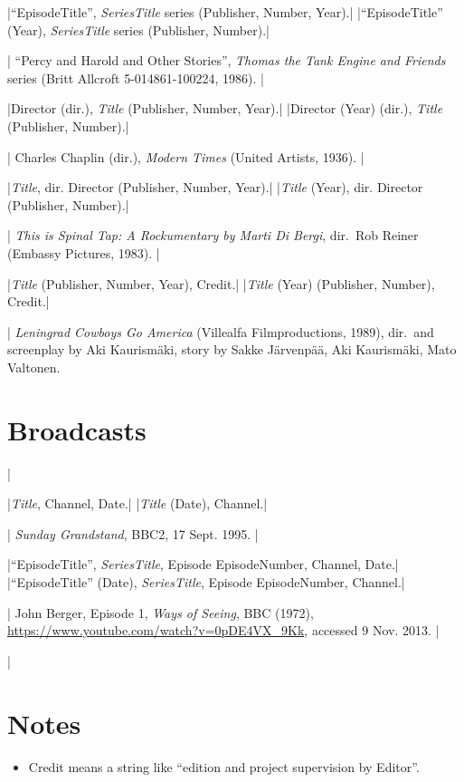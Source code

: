 \documentclass[extrafontsizes,11pt,a4paper,oneside]{memoir}
\newcommand*{\lit}[1]{\textsf{#1}}
\begin{document}
\specs
|\enquote{EpisodeTitle}, \emph{SeriesTitle} \lit{series} (Publisher, Number, Year).|%
|\enquote{EpisodeTitle} (Year), \emph{SeriesTitle} \lit{series} (Publisher, Number).|

\todoc|
\enquote{Percy and Harold and Other Stories}, \emph{Thomas the Tank Engine and Friends} series (Britt Allcroft 5-014861-100224, 1986).
|

\specs
|Director (\lit{dir.}), \emph{Title} (Publisher, Number, Year).|%
|Director (Year) (\lit{dir.}), \emph{Title} (Publisher, Number).|

\todoc|
Charles Chaplin (dir.), \emph{Modern Times} (United Artists, 1936).
|

\specs
|\emph{Title}, \lit{dir.} Director (Publisher, Number, Year).|%
|\emph{Title} (Year), \lit{dir.} Director (Publisher, Number).|

\todoc|
\emph{This is Spinal Tap: A Rockumentary by Marti Di Bergi}, dir.\ Rob Reiner (Embassy Pictures, 1983).
|

\specs
|\emph{Title} (Publisher, Number, Year), Credit.|%
|\emph{Title} (Year) (Publisher, Number), Credit.|

\todoc|
\emph{Leningrad Cowboys Go America} (Villealfa Filmproductions, 1989), dir.\ and screenplay by Aki Kaurismäki, story by Sakke Järvenpää, Aki Kaurismäki, Mato Valtonen.

\section{Broadcasts}
|

\specs
|\emph{Title}, Channel, Date.|%
|\emph{Title} (Date), Channel.|

\todoc|
\emph{Sunday Grandstand}, BBC2, 17 Sept. 1995.
|

\specs
|\enquote{EpisodeTitle}, \emph{SeriesTitle}, \lit{Episode} EpisodeNumber, Channel, Date.|%
|\enquote{EpisodeTitle} (Date), \emph{SeriesTitle}, \lit{Episode} EpisodeNumber, Channel.|

\todoc|
John Berger, Episode 1, \emph{Ways of Seeing}, BBC (1972), \url{https://www.youtube.com/watch?v=0pDE4VX_9Kk}, accessed 9 Nov. 2013.
|

\todoc|
\section{Notes}

\begin{itemize}
  \item Credit means a string like \enquote{edition and project supervision by Editor}.
\end{itemize}
\end{document}
